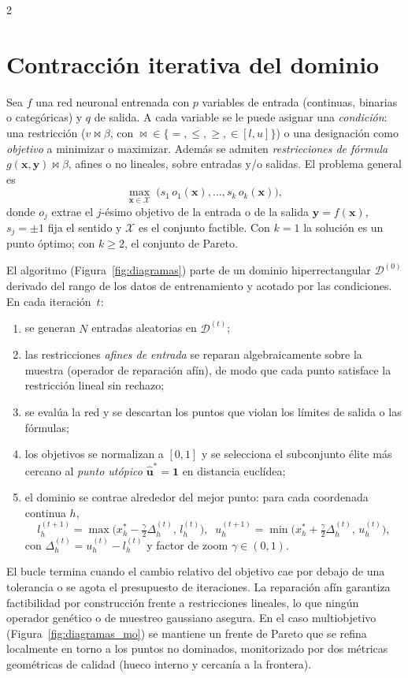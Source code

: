 \documentclass[5p,times,authoryear]{sciarticle}
\begin{document}
\begin{multicols}{2}
\section{Contracción iterativa del dominio}
\label{sec:metodo}
Sea $f$ una red neuronal entrenada con $p$ variables de entrada (continuas,
binarias o categóricas) y $q$ de salida. A cada variable se le puede
asignar una \emph{condición}: una restricción ($v\bowtie\beta$, con
$\bowtie\in\{=,\le,\ge,\in[l,u]\}$) o una designación como
\emph{objetivo} a minimizar o maximizar. Además se admiten
\emph{restricciones de fórmula} $g(\bm{x},\bm{y})\bowtie\beta$, afines o
no lineales, sobre entradas y/o salidas. El problema general es
\begin{equation}
  \max_{\bm{x}\in\mathcal{X}}\;\bigl(s_1\,o_1(\bm{x}),\ldots,s_k\,o_k(\bm{x})\bigr),
  \label{eq:problema}
\end{equation}
donde $o_j$ extrae el $j$-ésimo objetivo de la entrada o de la salida
$\bm{y}=f(\bm{x})$, $s_j=\pm1$ fija el sentido y $\mathcal{X}$ es el
conjunto factible. Con $k=1$ la solución es un punto óptimo; con
$k\ge 2$, el conjunto de Pareto.

El algoritmo (Figura~\ref{fig:diagramas}) parte de un dominio
hiperrectangular $\mathcal{D}^{(0)}$ derivado del rango de los datos de
entrenamiento y acotado por las condiciones. En cada iteración~$t$:
\begin{enumerate}\itemsep2pt
\item se generan $N$ entradas aleatorias en $\mathcal{D}^{(t)}$;
\item las restricciones \emph{afines de entrada} se reparan
  algebraicamente sobre la muestra (operador de reparación afín), de modo
  que cada punto satisface la restricción lineal sin rechazo;
\item se evalúa la red y se descartan los puntos que violan los límites
  de salida o las fórmulas;
\item los objetivos se normalizan a $[0,1]$ y se selecciona el
  subconjunto élite más cercano al \emph{punto utópico}
  $\hat{\bm{u}}^\ast=\bm{1}$ en distancia euclídea;
\item el dominio se contrae alrededor del mejor punto: para cada
  coordenada continua $h$,
  \begin{equation}
    l_h^{(t+1)}=\max\!\bigl(x_h^\ast-\tfrac{\gamma}{2}\Delta_h^{(t)},\,l_h^{(t)}\bigr),\;\;
    u_h^{(t+1)}=\min\!\bigl(x_h^\ast+\tfrac{\gamma}{2}\Delta_h^{(t)},\,u_h^{(t)}\bigr),
    \label{eq:reshape}
  \end{equation}
  con $\Delta_h^{(t)}=u_h^{(t)}-l_h^{(t)}$ y factor de zoom
  $\gamma\in(0,1)$.
\end{enumerate}
El bucle termina cuando el cambio relativo del objetivo cae por debajo de
una tolerancia o se agota el presupuesto de iteraciones. La reparación
afín garantiza factibilidad por construcción frente a restricciones
lineales, lo que ningún operador genético o de muestreo gaussiano asegura.
En el caso multiobjetivo (Figura~\ref{fig:diagramas_mo}) se mantiene un
frente de Pareto que se refina localmente en torno a los puntos no
dominados, monitorizado por dos métricas geométricas de calidad (hueco
interno y cercanía a la frontera).


\end{multicols}
\end{document}
